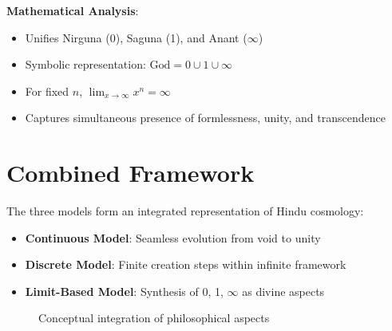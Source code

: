 \documentclass[11pt]{article}
\begin{document}
\textbf{Mathematical Analysis}:
\begin{itemize}
    \item Unifies Nirguna (0), Saguna (1), and Anant (\(\infty\))
    \item Symbolic representation: \(\text{God} = 0 \cup 1 \cup \infty\)
    \item For fixed \(n\), \(\lim_{x \to \infty} x^n = \infty\)
    \item Captures simultaneous presence of formlessness, unity, and transcendence
\end{itemize}

\section{Combined Framework}
The three models form an integrated representation of Hindu cosmology:
\begin{itemize}
    \item \textbf{Continuous Model}: Seamless evolution from void to unity
    \item \textbf{Discrete Model}: Finite creation steps within infinite framework
    \item \textbf{Limit-Based Model}: Synthesis of 0, 1, \(\infty\) as divine aspects
\end{itemize}

\begin{figure}[h]
\centering
{}
\caption{Conceptual integration of philosophical aspects}
\label{fig:conceptual_graph}
\end{figure}
\end{document}
